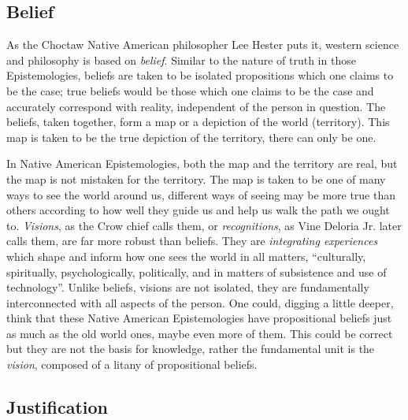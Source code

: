 \subsection{Belief}
As the Choctaw Native American philosopher Lee Hester puts it, western science and philosophy is based on \emph{belief}.\autocite[321]{Hester1} Similar to the nature of truth in those Epistemologies, beliefs are taken to be isolated propositions which one claims to be the case; true beliefs would be those which one claims to be the case and accurately correspond with reality, independent of the person in question. The beliefs, taken together, form a map or a depiction of the world (territory). This map is taken to be the true depiction of the territory, there can only be one. 

In Native American Epistemologies, both the map and the territory are real, but the map is not mistaken for the territory.\autocite[321]{Hester1} The map is taken to be one of many ways to see the world around us, different ways of seeing may be more true than others according to how well they guide us and help us walk the path we ought to.  
\emph{Visions}, as the Crow chief calls them, or \emph{recognitions}, as Vine Deloria Jr. later calls them,\autocite[362]{Deloria1} are far more robust than beliefs. They are \emph{integrating experiences} which shape and inform how one sees the world in all matters, ``culturally, spiritually, psychologically, politically, and in matters of subsistence and use of technology''.\autocite[321]{Hester1} Unlike beliefs, visions are not isolated, they are fundamentally interconnected with all aspects of the person. One could, digging a little deeper, think that these Native American Epistemologies have propositional beliefs just as much as the old world ones, maybe even more of them. This could be correct but they are not the basis for knowledge, rather the fundamental unit is the \emph{vision}, composed of a litany of propositional beliefs. 

\subsection{Justification}

